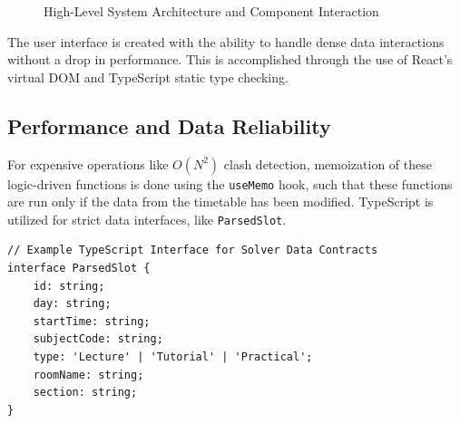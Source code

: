 \begin{figure}[htbp]
\centering
{}
\caption{High-Level System Architecture and Component Interaction}
\label{fig:system_architecture}
\end{figure}

The user interface is created with the ability to handle dense data interactions without a drop in performance. This is accomplished through the use of React's virtual DOM and TypeScript static type checking.

\subsection{Performance and Data Reliability}

For expensive operations like $O(N^2)$ clash detection, memoization of these logic-driven functions is done using the \texttt{useMemo} hook, such that these functions are run only if the data from the timetable has been modified. TypeScript is utilized for strict data interfaces, like \texttt{ParsedSlot}.

\begin{verbatim}
// Example TypeScript Interface for Solver Data Contracts
interface ParsedSlot {
    id: string;
    day: string;
    startTime: string;
    subjectCode: string;
    type: 'Lecture' | 'Tutorial' | 'Practical';
    roomName: string;
    section: string;
}
\end{verbatim}


